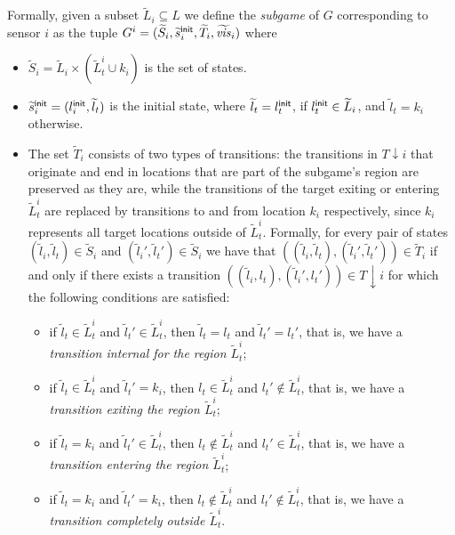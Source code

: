 Formally, given a subset  $\widetilde{L}_i \subseteq L$ we define the \emph{subgame} of $G$ corresponding to sensor $i$ as the tuple $G^i = (\widetilde{S}_i,\widetilde{s}_i^{\mathsf{init}},\widetilde{T}_i,\widetilde{\mathit{vis}}_i)$  where
\begin{itemize}
\item $\widetilde{S}_i= \widetilde{L}_i \times (\widetilde{L}^i_t \cup k_i)$ is the set of states.
\item $\widetilde s_i^{\mathsf{init}} = (l_i^{\mathsf{init}},\widetilde l_t)$ is the initial state, where $\widetilde l_t =  l_t^{\mathsf{init}}$, if
$ l_t^{\mathsf{init}} \in \widetilde L_i$, and $\widetilde l_t = k_i$ otherwise.
\item The set $\widetilde{T}_i$ consists of two types of transitions: the transitions in $T{\downarrow } i$ that originate and end in locations that are part of the subgame's region are preserved as they are, while the transitions of the target exiting or entering $\widetilde{L}^i_t$ are replaced by transitions to and from location $k_i$ respectively, since $k_i$ represents all target locations outside of  $\widetilde{L}^i_t$. 
Formally, for every pair of states $(\widetilde{l}_i,\widetilde{l}_t) \in \widetilde{S}_i$ and $(\widetilde{l}_i',\widetilde{l}_t') \in \widetilde{S}_i$ we have that $((\widetilde{l}_i,\widetilde l_t),(\widetilde{l}_i',\widetilde l_t')) \in \widetilde T_i$ if and only if there exists a transition
 $((\widetilde{l}_i,l_t),(\widetilde{l}_i',l_t')) \in T{\downarrow}i$ for which the following conditions are satisfied:
 \begin{itemize}
 \item if $\widetilde l_t \in \widetilde L_t ^i$ and $\widetilde l_t' \in \widetilde L_t ^i$, then 
 $\widetilde l_t = l_t$ and $\widetilde l_t'= l_t'$, that is, we have a \emph{transition internal for the region $\widetilde L_t^i$};
 \item if $\widetilde l_t \in \widetilde L_t ^i$ and $\widetilde l_t' =  k_i$, then 
 $l_t \in \widetilde L_t^i$ and $l_t' \not\in \widetilde L_t^i$, that is, we have a \emph{transition exiting the region $\widetilde L_t^i$}; 
 \item if $\widetilde l_t= k_i$ and $\widetilde l_t' \in  \widetilde L_t ^i$, then 
 $l_t \not \in \widetilde L_t^i$ and $l_t' \in \widetilde L_t^i$, that is, we have a \emph{transition entering the region $\widetilde L_t^i$}; 
 \item if $\widetilde l_t= k_i$ and $\widetilde l_t' =  k_i$, then 
 $l_t \not \in \widetilde L_t^i$ and $l_t' \not\in \widetilde L_t^i$, that is, we have a \emph{transition completely outside $\widetilde L_t^i$}.
\end{itemize}  


\end{itemize}
